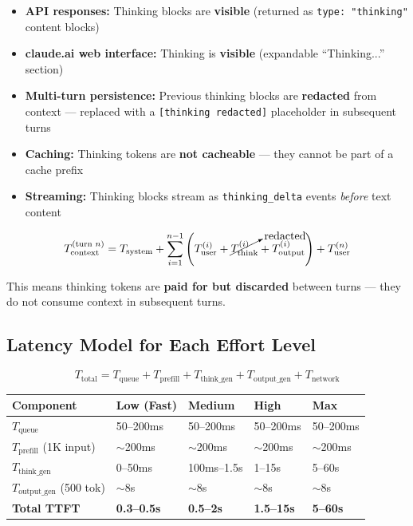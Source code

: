 \documentclass[11pt,a4paper]{article}
\begin{document}
\begin{tcolorbox}[colback=orange!5, colframe=orange!60!black, title={\bfseries Thinking Token Visibility Rules}]
\begin{itemize}[itemsep=2pt]
  \item \textbf{API responses:} Thinking blocks are \textbf{visible} (returned as \texttt{type: "thinking"} content blocks)
  \item \textbf{claude.ai web interface:} Thinking is \textbf{visible} (expandable ``Thinking...'' section)
  \item \textbf{Multi-turn persistence:} Previous thinking blocks are \textbf{redacted} from context --- replaced with a \texttt{[thinking redacted]} placeholder in subsequent turns
  \item \textbf{Caching:} Thinking tokens are \textbf{not cacheable} --- they cannot be part of a cache prefix
  \item \textbf{Streaming:} Thinking blocks stream as \texttt{thinking\_delta} events \textit{before} text content
\end{itemize}
\end{tcolorbox}

$$T_{\text{context}}^{(\text{turn } n)} = T_{\text{system}} + \sum_{i=1}^{n-1}\left(T_{\text{user}}^{(i)} + \cancelto{\text{redacted}}{T_{\text{think}}^{(i)}} + T_{\text{output}}^{(i)}\right) + T_{\text{user}}^{(n)}$$

This means thinking tokens are \textbf{paid for but discarded} between turns --- they do not consume context in subsequent turns.

\subsection{Latency Model for Each Effort Level}

$$T_{\text{total}} = T_{\text{queue}} + T_{\text{prefill}} + T_{\text{think\_gen}} + T_{\text{output\_gen}} + T_{\text{network}}$$

\begin{center}
\begin{tabular}{lllll}
\toprule
\textbf{Component} & \textbf{Low (Fast)} & \textbf{Medium} & \textbf{High} & \textbf{Max} \\
\midrule
$T_{\text{queue}}$ & 50--200ms & 50--200ms & 50--200ms & 50--200ms \\
$T_{\text{prefill}}$ (1K input) & $\sim$200ms & $\sim$200ms & $\sim$200ms & $\sim$200ms \\
$T_{\text{think\_gen}}$ & 0--50ms & 100ms--1.5s & 1--15s & 5--60s \\
$T_{\text{output\_gen}}$ (500 tok) & $\sim$8s & $\sim$8s & $\sim$8s & $\sim$8s \\
\textbf{Total TTFT} & \textbf{0.3--0.5s} & \textbf{0.5--2s} & \textbf{1.5--15s} & \textbf{5--60s} \\
\bottomrule
\end{tabular}
\end{center}
\end{document}
